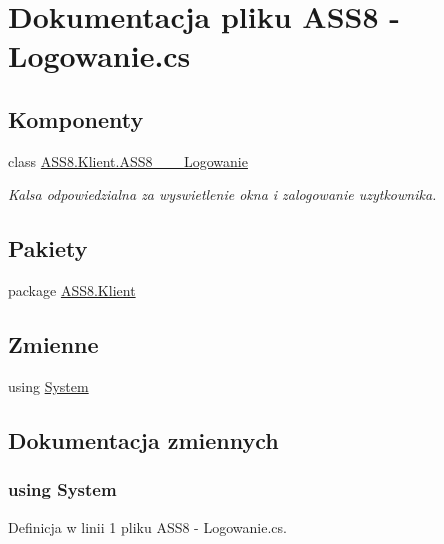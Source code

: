 \hypertarget{a00040}{
\section{Dokumentacja pliku ASS8 - Logowanie.cs}
\label{db/d3a/a00040}
}
\subsection*{Komponenty}
\begin{CompactItemize}
\item 
class \hyperlink{a00001}{ASS8.Klient.ASS8\_\-\_\-\_\-Logowanie}
\begin{CompactList}\small\item\em Kalsa odpowiedzialna za wyswietlenie okna i zalogowanie uzytkownika. \item\end{CompactList}\end{CompactItemize}
\subsection*{Pakiety}
\begin{CompactItemize}
\item 
package \hyperlink{a00060}{ASS8.Klient}
\end{CompactItemize}
\subsection*{Zmienne}
\begin{CompactItemize}
\item 
﻿using \hyperlink{a00040_81a223a02c34d82b47199f08308847f2}{System}
\end{CompactItemize}


\subsection{Dokumentacja zmiennych}
\hypertarget{a00040_81a223a02c34d82b47199f08308847f2}{
\subsubsection[{System}]{\setlength{\rightskip}{0pt plus 5cm}﻿using {\bf System}}}
\label{db/d3a/a00040_81a223a02c34d82b47199f08308847f2}




Definicja w linii 1 pliku ASS8 - Logowanie.cs.